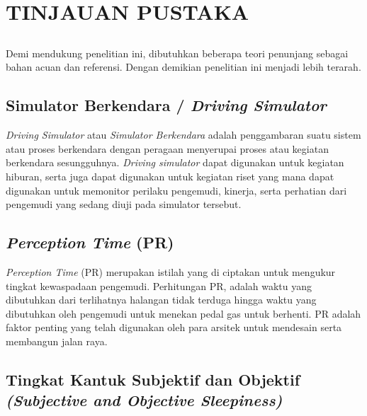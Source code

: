 \chapter{TINJAUAN PUSTAKA}
\vspace{1ex}

\section*{}
Demi mendukung penelitian ini, dibutuhkan beberapa teori penunjang sebagai bahan acuan dan referensi. Dengan demikian penelitian ini menjadi lebih terarah. 
\vspace{1ex}

\section{Simulator Berkendara / \textit{Driving Simulator}}
\vspace{1ex}

\textit{Driving Simulator} atau \textit{Simulator Berkendara}  adalah penggambaran suatu sistem atau proses berkendara dengan peragaan menyerupai proses atau kegiatan berkendara sesungguhnya. \textit{Driving simulator} dapat digunakan untuk kegiatan hiburan, serta juga dapat digunakan untuk kegiatan riset yang mana dapat digunakan untuk memonitor perilaku pengemudi, kinerja, serta perhatian dari pengemudi yang sedang diuji pada simulator tersebut. \cite{cit:11}
\vspace{1ex}

\section{\textit{Perception Time} (PR)}
\vspace{1ex}

\textit{Perception Time} (PR) merupakan istilah yang di ciptakan untuk mengukur tingkat kewaspadaan pengemudi. Perhitungan PR, adalah waktu yang dibutuhkan dari terlihatnya halangan tidak terduga hingga waktu yang dibutuhkan oleh pengemudi untuk menekan pedal gas untuk berhenti. PR adalah faktor penting yang telah digunakan oleh para arsitek untuk mendesain serta membangun jalan raya. \cite{cit:8}
\vspace{1ex}

\section{Tingkat Kantuk Subjektif dan Objektif \textit{(Subjective and Objective Sleepiness)}}
\vspace{1ex}

